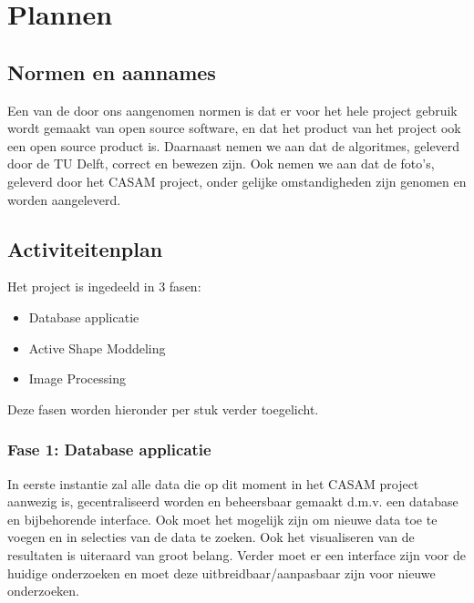 \section{Plannen}
\label{plannen}


\subsection{Normen en aannames}
Een van de door ons aangenomen normen is dat er voor het hele project gebruik wordt gemaakt van open source software, en dat het product van het project ook een open source product is. 
Daarnaast nemen we aan dat de algoritmes, geleverd door de TU Delft, correct en bewezen zijn.
Ook nemen we aan dat de foto's, geleverd door het CASAM project, onder gelijke omstandigheden zijn genomen en worden aangeleverd.

\subsection{Activiteitenplan}
Het project is ingedeeld in 3 fasen:
\begin{itemize}
	\item Database applicatie
	\item Active Shape Moddeling
	\item Image Processing
\end{itemize}
Deze fasen worden hieronder per stuk verder toegelicht.

\subsubsection{Fase 1: Database applicatie}
In eerste instantie zal alle data die op dit moment in het CASAM project aanwezig is, gecentraliseerd worden en beheersbaar gemaakt d.m.v. een database en bijbehorende interface. 
Ook moet het mogelijk zijn om nieuwe data toe te voegen en in selecties van de data te zoeken. 
Ook het visualiseren van de resultaten is uiteraard van groot belang. 
Verder moet er een interface zijn voor de huidige onderzoeken en moet deze uitbreidbaar/aanpasbaar zijn voor nieuwe onderzoeken.

